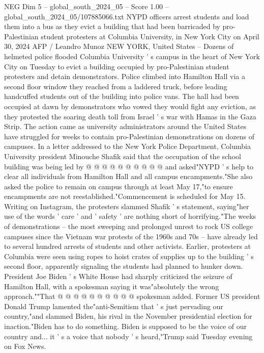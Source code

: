\begin{textsample}{NEG Dim 5 – global\_south\_2024\_05 – Score 1.00 – global\_south\_2024\_05/107885066.txt}  \label{ex:f5_neg_327}
NYPD officers arrest students and load them into a bus as they evict a building that had been barricaded by pro-Palestinian student protesters at Columbia University, in New York City on April 30, 2024 AFP / Leandro Munoz NEW YORK, United States -- Dozens of helmeted police flooded Columbia University ' s campus in the heart of New York City on Tuesday to evict a building occupied by pro-Palestinian student protesters and detain demonstrators.
Police climbed into Hamilton Hall via a second floor window they reached from a laddered truck, before leading handcuffed students out of the building into police vans.
The hall had been occupied at dawn by demonstrators who vowed they would fight any eviction, as they protested the soaring death toll from Israel ' s war with Hamas in the Gaza Strip.
The action came as university administrators around the United States have struggled for weeks to contain pro-Palestinian demonstrations on dozens of campuses.
In a letter addressed to the New York Police Department, Columbia University president Minouche Shafik said that the occupation of the school building was being led by @ @ @ @ @ @ @ @ @ @ and asked"NYPD ' s help to clear all individuals from Hamilton Hall and all campus encampments."She also asked the police to remain on campus through at least May 17,"to ensure encampments are not reestablished."Commencement is scheduled for May 15.
Writing on Instagram, the protesters slammed Shafik ' s statement, saying"her use of the words ' care ' and ' safety ' are nothing short of horrifying."The weeks of demonstrations -- the most sweeping and prolonged unrest to rock US college campuses since the Vietnam war protests of the 1960s and 70s -- have already led to several hundred arrests of students and other activists.
Earlier, protesters at Columbia were seen using ropes to hoist crates of supplies up to the building ' s second floor, apparently signaling the students had planned to hunker down.
President Joe Biden ' s White House had sharply criticized the seizure of Hamilton Hall, with a spokesman saying it was"absolutely the wrong approach.""That @ @ @ @ @ @ @ @ @ @ spokesman added.
Former US president Donald Trump lamented the"anti-Semitism that ' s just pervading our country,"and slammed Biden, his rival in the November presidential election for inaction."Biden has to do something.
Biden is supposed to be the voice of our country and... it ' s a voice that nobody ' s heard,"Trump said Tuesday evening on Fox News.

\end{textsample}

